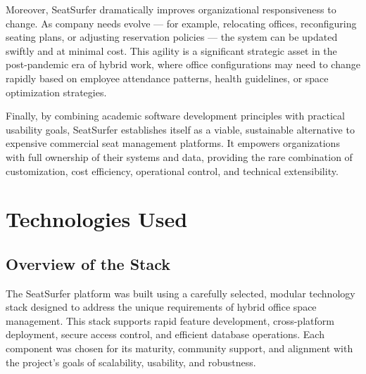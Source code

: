 \documentclass[12pt,a4paper]{report}
\begin{document}
Moreover, SeatSurfer dramatically improves organizational responsiveness to change. As company needs evolve — for example, relocating offices, reconfiguring seating plans, or adjusting reservation policies — the system can be updated swiftly and at minimal cost. This agility is a significant strategic asset in the post-pandemic era of hybrid work, where office configurations may need to change rapidly based on employee attendance patterns, health guidelines, or space optimization strategies.

Finally, by combining academic software development principles with practical usability goals, SeatSurfer establishes itself as a viable, sustainable alternative to expensive commercial seat management platforms. It empowers organizations with full ownership of their systems and data, providing the rare combination of customization, cost efficiency, operational control, and technical extensibility.

\newpage

\chapter{Technologies Used}

\section{Overview of the Stack}

The SeatSurfer platform was built using a carefully selected, modular technology stack designed to address the unique requirements of hybrid office space management. This stack supports rapid feature development, cross-platform deployment, secure access control, and efficient database operations. Each component was chosen for its maturity, community support, and alignment with the project's goals of scalability, usability, and robustness.
\end{document}
